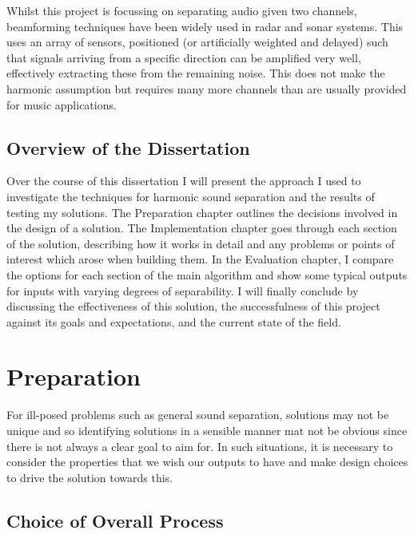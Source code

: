 \documentclass[12pt,a4paper,twoside,openright]{report}
\begin{document}
Whilst this project is focussing on separating audio given two channels, beamforming techniques have been widely used in radar and sonar systems. This uses an array of sensors, positioned (or artificially weighted and delayed) such that signals arriving from a specific direction can be amplified very well, effectively extracting these from the remaining noise. {\color{red}This does not make the harmonic assumption but requires many more channels than are usually provided for music applications.}

\section{Overview of the Dissertation}

Over the course of this dissertation I will present the approach I used to investigate the techniques for harmonic sound separation and the results of testing my solutions. The Preparation chapter outlines the decisions involved in the design of a solution. The Implementation chapter goes through each section of the solution, describing how it works in detail and any problems or points of interest which arose when building them. In the Evaluation chapter, I compare the options for each section of the main algorithm and show some typical outputs for inputs with varying degrees of separability. I will finally conclude by discussing the effectiveness of this solution, the successfulness of this project against its goals and expectations, and the current state of the field.

\chapter{Preparation}

For ill-posed problems such as general sound separation, solutions may not be unique and so identifying solutions in a sensible manner mat not be obvious since there is not always a clear goal to aim for. In such situations, it is necessary to consider the properties that we wish our outputs to have and make design choices to drive the solution towards this.

\section{Choice of Overall Process}
\end{document}
